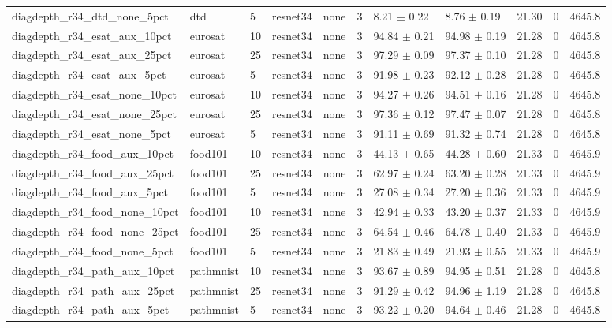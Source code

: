 \begin{tabular}{lllllllllll}
diagdepth_r34_dtd_none_5pct & dtd & 5 & resnet34 & none & 3 & 8.21 $\pm$ 0.22 & 8.76 $\pm$ 0.19 & 21.30 & 0 & 4645.8 \\
diagdepth_r34_esat_aux_10pct & eurosat & 10 & resnet34 & none & 3 & 94.84 $\pm$ 0.21 & 94.98 $\pm$ 0.19 & 21.28 & 0 & 4645.8 \\
diagdepth_r34_esat_aux_25pct & eurosat & 25 & resnet34 & none & 3 & 97.29 $\pm$ 0.09 & 97.37 $\pm$ 0.10 & 21.28 & 0 & 4645.8 \\
diagdepth_r34_esat_aux_5pct & eurosat & 5 & resnet34 & none & 3 & 91.98 $\pm$ 0.23 & 92.12 $\pm$ 0.28 & 21.28 & 0 & 4645.8 \\
diagdepth_r34_esat_none_10pct & eurosat & 10 & resnet34 & none & 3 & 94.27 $\pm$ 0.26 & 94.51 $\pm$ 0.16 & 21.28 & 0 & 4645.8 \\
diagdepth_r34_esat_none_25pct & eurosat & 25 & resnet34 & none & 3 & 97.36 $\pm$ 0.12 & 97.47 $\pm$ 0.07 & 21.28 & 0 & 4645.8 \\
diagdepth_r34_esat_none_5pct & eurosat & 5 & resnet34 & none & 3 & 91.11 $\pm$ 0.69 & 91.32 $\pm$ 0.74 & 21.28 & 0 & 4645.8 \\
diagdepth_r34_food_aux_10pct & food101 & 10 & resnet34 & none & 3 & 44.13 $\pm$ 0.65 & 44.28 $\pm$ 0.60 & 21.33 & 0 & 4645.9 \\
diagdepth_r34_food_aux_25pct & food101 & 25 & resnet34 & none & 3 & 62.97 $\pm$ 0.24 & 63.20 $\pm$ 0.28 & 21.33 & 0 & 4645.9 \\
diagdepth_r34_food_aux_5pct & food101 & 5 & resnet34 & none & 3 & 27.08 $\pm$ 0.34 & 27.20 $\pm$ 0.36 & 21.33 & 0 & 4645.9 \\
diagdepth_r34_food_none_10pct & food101 & 10 & resnet34 & none & 3 & 42.94 $\pm$ 0.33 & 43.20 $\pm$ 0.37 & 21.33 & 0 & 4645.9 \\
diagdepth_r34_food_none_25pct & food101 & 25 & resnet34 & none & 3 & 64.54 $\pm$ 0.46 & 64.78 $\pm$ 0.40 & 21.33 & 0 & 4645.9 \\
diagdepth_r34_food_none_5pct & food101 & 5 & resnet34 & none & 3 & 21.83 $\pm$ 0.49 & 21.93 $\pm$ 0.55 & 21.33 & 0 & 4645.9 \\
diagdepth_r34_path_aux_10pct & pathmnist & 10 & resnet34 & none & 3 & 93.67 $\pm$ 0.89 & 94.95 $\pm$ 0.51 & 21.28 & 0 & 4645.8 \\
diagdepth_r34_path_aux_25pct & pathmnist & 25 & resnet34 & none & 3 & 91.29 $\pm$ 0.42 & 94.96 $\pm$ 1.19 & 21.28 & 0 & 4645.8 \\
diagdepth_r34_path_aux_5pct & pathmnist & 5 & resnet34 & none & 3 & 93.22 $\pm$ 0.20 & 94.64 $\pm$ 0.46 & 21.28 & 0 & 4645.8 \\

\end{tabular}
